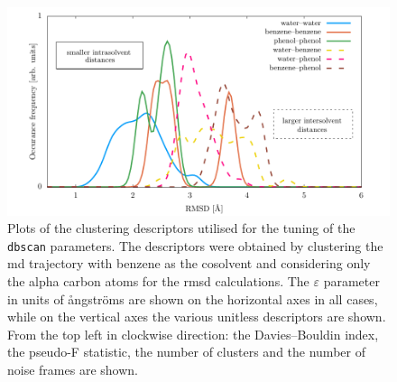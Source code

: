 \begin{figure}
\centering
\includegraphics[width=\textwidth]{sections/results/images/clusterrep_distances/to_pdf/clusterrep_distances_to_pdf.pdf}
\caption{Plots of the clustering descriptors utilised for the tuning of the  \texttt{dbscan} parameters.
The descriptors were obtained by clustering the \gls{md} trajectory with benzene as the cosolvent and considering only the alpha carbon atoms for the \gls{rmsd} calculations.
The $\varepsilon$ parameter in units of \aa{}ngstr\"oms are shown on the horizontal axes in all cases, while on the vertical axes the various unitless descriptors are shown.
From the top left in clockwise direction: the Davies--Bouldin index, the pseudo-F statistic, the number of clusters and the number of noise frames are shown.}
\label{fig:benzene_clustering_ca}
\end{figure}
